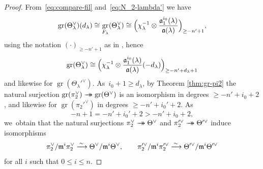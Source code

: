 \documentclass[JEP,XML,SOM,Unicode,NoFloatCountersInSection, NoEqCountersInSection,published]{cedram}
\newcommand{\onto}{\mathchoice{\to\hspace*{-5mm}\to}{\mathrel{\hbox{$\to\hspace*{-2.85mm}\to$}}}{\to\hspace*{-3mm}\to}{\to\hspace*{-3mm}\to}}
\newcommand{\fa}{\mathfrak{a}}
\DeclareMathOperator{\gr}{gr}
\theoremstyle{plain}
\theoremstyle{definition}
\begin{document}
\begin{proof}
From~\eqref{eq:compare-fil} and~\eqref{eq:N_2-lambda'} we have
\begin{equation*}
\gr(\Theta_\lambda^\vee)(d_\lambda) \cong \gr_{F_\lambda}(\Theta_\lambda^\vee) \cong \Bigl(\chi_{\lambda}^{-1}\otimes \frac{\fa_1^{i_0}(\lambda)}{\fa(\lambda)}\Bigr)_{\ge -n'+1},
\end{equation*}
using the notation $(\cdot)_{\ge -n'+1}$ as in \cite[Lem.\,2.2.7]{BHHMS4}, hence
\begin{equation}\label{eq:gr-Theta-lambda}
\gr(\Theta_\lambda^\vee) \cong \Bigl(\chi_{\lambda}^{-1}\otimes \frac{\fa_1^{i_0}(\lambda)}{\fa(\lambda)}(-d_\lambda)\Bigr)_{\ge -n'+d_\lambda+1}
\end{equation}
and likewise for $\gr(\Theta_\lambda'^\vee)$. As~$i_0+1 \ge d_\lambda$, by Theorem \ref{thm:gr-pi2} the natural surjection $\gr(\pi_2^\vee) \onto \gr(\Theta^\vee)$ is an isomorphism in degrees $\ge -n'+i_0+2$, and likewise for $\gr(\pi_2'^\vee)$ in degrees $\ge -n'+i_0'+2$. As
\[
-n+1 = -n'+i_0'+2 > -n'+i_0+2,
\]
we~obtain that the natural surjections $\pi_2^\vee \onto \Theta^\vee$ and $\pi_2'^\vee \onto \Theta'^\vee$ induce isomorphisms
\begin{equation}\label{eq:pi2-vs-Theta}
\pi_2^\vee/\mathfrak{m}^i\pi_2^\vee \xrightarrow{\,\sim\,} \Theta^\vee/\mathfrak{m}^i \Theta^\vee, \qquad \pi_2'^\vee/\mathfrak{m}^i\pi_2'^\vee \xrightarrow{\,\sim\,} \Theta'^\vee/\mathfrak{m}^i \Theta'^\vee
\end{equation}
for all $i$ such that $0 \le i \le n$.


\end{proof}
\end{document}
